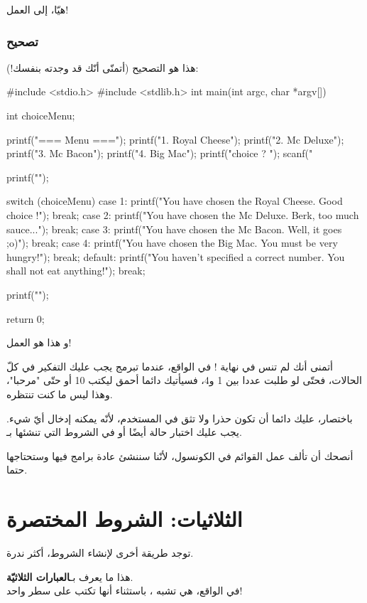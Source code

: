 هيّا، إلى العمل!

\subsubsection{تصحيح}

هذا هو التصحيح (أتمنّى أنّك قد وجدته بنفسك!):

\begin{Csource}
#include <stdio.h>
#include <stdlib.h>
int main(int argc, char *argv[])
{
	int choiceMenu;
	
	printf("=== Menu ===\n\n");
	printf("1. Royal Cheese\n");
	printf("2. Mc Deluxe\n");
	printf("3. Mc Bacon\n");
	printf("4. Big Mac\n");
	printf("\nYour choice ? ");
	scanf("%
	
	printf("\n");
	
	switch (choiceMenu)
	{
		case 1:
		printf("You have chosen the Royal Cheese. Good choice !");
		break;
		case 2:
		printf("You have chosen the Mc Deluxe. Berk, too much sauce...");
		break;
		case 3:
		printf("You have chosen the Mc Bacon. Well, it goes ;o)");
		break;
		case 4:
		printf("You have chosen the Big Mac. You must be very hungry!");
		break;
		default:
		printf("You haven't specified a correct number. You shall not eat anything!");
		break;
	}
	
	printf("\n\n");
	
	return 0;
}
\end{Csource}
و هذا هو العمل!

أتمنى أنك لم تنس 
 في نهاية !
في الواقع، عندما تبرمج يجب عليك التفكير في كلّ الحالات،  فحتّى لو طلبت عددا بين 1 و4، فسيأتيك دائما أحمق ليكتب 10 أو حتّى "مرحبا"،  وهذا ليس ما كنت تنتظره. 

باختصار، عليك دائما أن تكون حذرا ولا تثق في المستخدم، لأنّه يمكنه إدخال أيّ شيء. يجب عليك اختبار حالة
أيضًا أو
في الشروط التي تنشئها بـ.

\begin{information}
أنصحك أن تألف عمل القوائم في الكونسول، لأنّنا سننشئ عادة برامج فيها وستحتاجها حتما.
\end{information}

\section{الثلاثيات: الشروط المختصرة}

توجد طريقة أخرى لإنشاء الشروط، أكثر ندرة.

هذا ما يعرف بـ\textbf{العبارات الثلاثيّة}.\\
في الواقع، هي تشبه
،
باستثناء أنها تكتب على سطر واحد!

